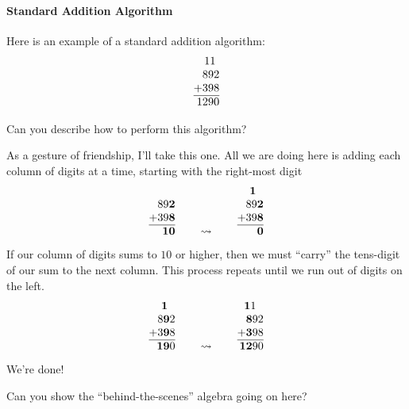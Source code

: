 \paragraph{Standard Addition Algorithm}
Here is an example of a standard addition algorithm:
\[
\begin{tabular}{@{}r@{}}
11~~\\
892\\
+398\\ \hline
1290
\end{tabular}
\]

\begin{question}
Can you describe how to perform this algorithm?
\end{question}

As a gesture of friendship, I'll take this one. All we are doing here
is adding each column of digits at a time, starting with the right-most
digit
\[
\begin{array}[b]{@{}r@{}}
89\textbf{2}\\
+39\textbf{8}\\ \hline
~~\textbf{10}
\end{array}
\qquad
\leadsto
\qquad
\begin{array}[b]{@{}r@{}}
\textbf{1}~~\\
89\textbf{2}\\
+39\textbf{8}\\ \hline
~~~\textbf{0}
\end{array}
\]
If our column of digits sums to $10$ or higher, then we must ``carry''
the tens-digit of our sum to the next column. This process repeats
until we run out of digits on the left.
\[
\begin{array}[b]{@{}r@{}}
\textbf{1}~~\\
8\textbf{9}2\\
+3\textbf{9}8\\ \hline
~\textbf{19}0
\end{array}
\qquad
\leadsto
\qquad
\begin{array}[b]{@{}r@{}}
\textbf{1}1~~\\
\textbf{8}92\\
+\textbf{3}98\\ \hline
\textbf{12}90
\end{array}
\]
We're done!

\begin{question}
Can you show the ``behind-the-scenes'' algebra going on here?
\end{question}

